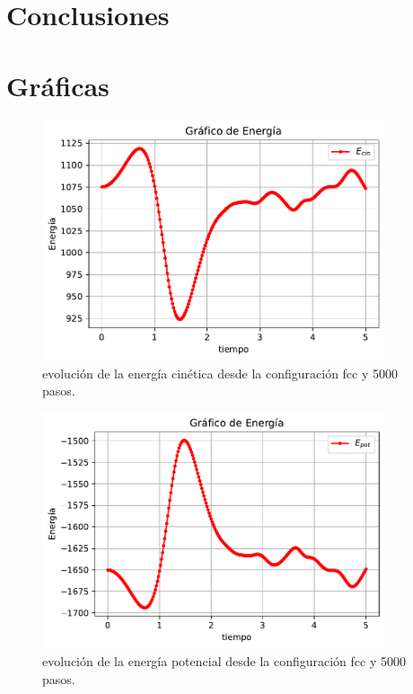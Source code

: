 \documentclass[11pt]{article} %
\begin{document}
\section{Conclusiones}


\section{Gráficas}


\begin{figure}[h!] \centering
	\includegraphics[width=0.9\textwidth]{../../Graficas/Ecin-equilibra.pdf}
	\caption{evolución de la energía cinética desde la configuración fcc y 5000 pasos.}
	\label{Fig:02}
\end{figure}	

\begin{figure}[h!] \centering
	\includegraphics[width=0.9\textwidth]{../../Graficas/Epot-equilibra.pdf}
	\caption{evolución de la energía potencial desde la configuración fcc y 5000 pasos.}
	\label{Fig:03}
\end{figure}	
\end{document}
